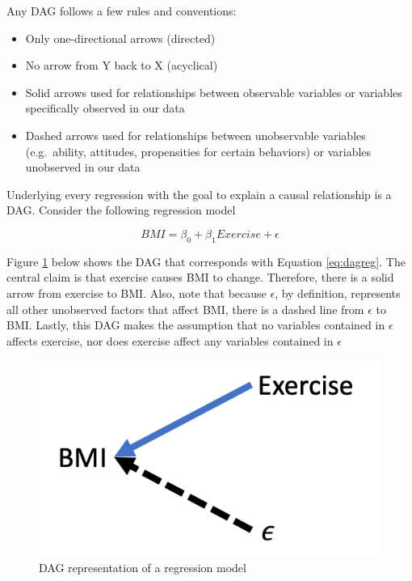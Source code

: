 \documentclass[
]{book}
\providecommand{\tightlist}{%
  \setlength{\itemsep}{0pt}\setlength{\parskip}{0pt}}
\begin{document}
Any DAG follows a few rules and conventions:

\begin{itemize}
\tightlist
\item
  Only one-directional arrows (directed)
\item
  No arrow from Y back to X (acyclical)
\item
  Solid arrows used for relationships between observable variables or variables specifically observed in our data
\item
  Dashed arrows used for relationships between unobservable variables (e.g.~ability, attitudes, propensities for certain behaviors) or variables unobserved in our data
\end{itemize}

Underlying every regression with the goal to explain a causal relationship is a DAG. Consider the following regression model

\begin{equation}
BMI = \beta_0 + \beta_1Exercise + \epsilon
\label{eq:dagreg}
\end{equation}

Figure \ref{fig:dagreg} below shows the DAG that corresponds with Equation \eqref{eq:dagreg}. The central claim is that exercise causes BMI to change. Therefore, there is a solid arrow from exercise to BMI. Also, note that because \(\epsilon\), by definition, represents all other unobserved factors that affect BMI, there is a dashed line from \(\epsilon\) to BMI. Lastly, this DAG makes the assumption that no variables contained in \(\epsilon\) affects exercise, nor does exercise affect any variables contained in \(\epsilon\)

\begin{figure}

{\centering \includegraphics[width=\textwidth]{images/dag_reg} 

}

\caption{DAG representation of a regression model}\label{fig:dagreg}
\end{figure}
\end{document}
